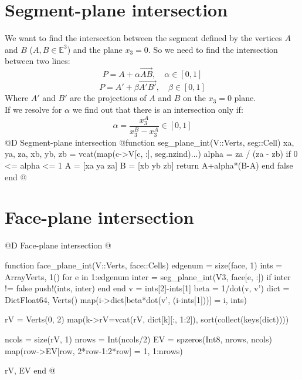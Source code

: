 \documentclass[10pt,oneside]{article}
\begin{document}
\section{Segment-plane intersection}
We want to find the intersection between the segment defined by the vertices $A$ and $B$ ($A, B \in \mathbb{E}^3$) and the plane $x_3=0$.
So we need to find the intersection between two lines:
\[ P=A+\alpha\overrightarrow{AB}, \quad \alpha \in [0,1] \]
\[ P=A'+\beta\overrightarrow{A'B'}, \quad \beta \in [0,1] \]
Where $A'$ and $B'$ are the projections of $A$ and $B$ on the $x_3=0$ plane. \\
If we resolve for $\alpha$ we find out that there is an intersection only if:
\[ \alpha = \frac{x^A_3}{x^B_3 - x^A_3} \in [0,1]\]
@D Segment-plane intersection
@{function seg_plane_int(V::Verts, seg::Cell)
    xa, ya, za, xb, yb, zb = vcat(map(c->V[c, :], seg.nzind)...)
    alpha = za / (za - zb)
    if 0 <= alpha <= 1
        A = [xa ya za]
        B = [xb yb zb]
        return A+alpha*(B-A)
    end
    false
end
@}


\section{Face-plane intersection}
@D Face-plane intersection
@{function face_plane_int(V::Verts, face::Cells)
    edgenum = size(face, 1)
    ints = Array{Verts, 1}()
    for e in 1:edgenum
        inter = seg_plane_int(V3, face[e, :])
        if inter != false
            push!(ints, inter)
        end
    end
    v = ints[2]-ints[1]
    beta = 1/dot(v, v')
    dict = Dict{Float64, Verts}()
    map(i->dict[beta*dot(v', (i-ints[1]))] = i, ints)
    
    rV = Verts(0, 2)
    map(k->rV=vcat(rV, dict[k][:, 1:2]), sort(collect(keys(dict))))

    ncols = size(rV, 1)
    nrows = Int(ncols/2)
    EV = spzeros(Int8, nrows, ncols)
    map(row->EV[row, 2*row-1:2*row] = 1, 1:nrows)

    rV, EV
end
@}


\end{document}
